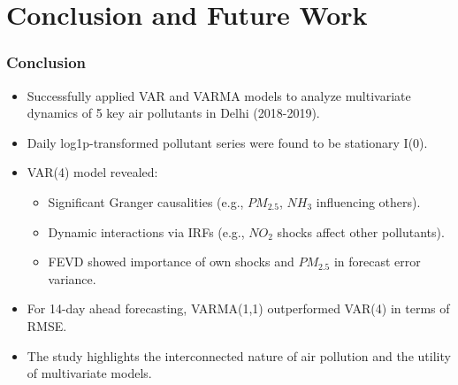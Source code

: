 \documentclass[svgnames, 12pt]{beamer}
\begin{document}
\section{Conclusion and Future Work}
\begin{frame}
    \frametitle{Conclusion}
    \begin{itemize}
        \item Successfully applied VAR and VARMA models to analyze multivariate dynamics of 5 key air pollutants in Delhi (2018-2019).
        \item Daily log1p-transformed pollutant series were found to be stationary I(0).
        \item VAR(4) model revealed:
            \begin{itemize}
                \item Significant Granger causalities (e.g., $PM_{2.5}$, $NH_3$ influencing others).
                \item Dynamic interactions via IRFs (e.g., $NO_2$ shocks affect other pollutants).
                \item FEVD showed importance of own shocks and $PM_{2.5}$ in forecast error variance.
            \end{itemize}
        \item For 14-day ahead forecasting, VARMA(1,1) outperformed VAR(4) in terms of RMSE.
        \item The study highlights the interconnected nature of air pollution and the utility of multivariate models.
    \end{itemize}
\end{frame}
\end{document}
